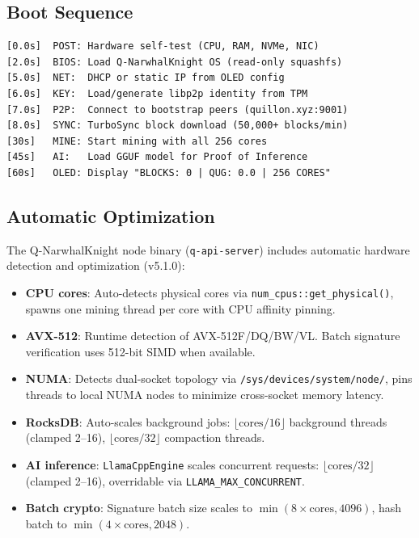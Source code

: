 \documentclass[11pt,a4paper]{article}
\begin{document}
\subsection{Boot Sequence}

\begin{lstlisting}[caption={Forge boot sequence (automated firmware)}]
[0.0s]  POST: Hardware self-test (CPU, RAM, NVMe, NIC)
[2.0s]  BIOS: Load Q-NarwhalKnight OS (read-only squashfs)
[5.0s]  NET:  DHCP or static IP from OLED config
[6.0s]  KEY:  Load/generate libp2p identity from TPM
[7.0s]  P2P:  Connect to bootstrap peers (quillon.xyz:9001)
[8.0s]  SYNC: TurboSync block download (50,000+ blocks/min)
[30s]   MINE: Start mining with all 256 cores
[45s]   AI:   Load GGUF model for Proof of Inference
[60s]   OLED: Display "BLOCKS: 0 | QUG: 0.0 | 256 CORES"
\end{lstlisting}

\subsection{Automatic Optimization}

The Q-NarwhalKnight node binary (\texttt{q-api-server}) includes automatic hardware detection and optimization (v5.1.0):

\begin{itemize}[noitemsep]
    \item \textbf{CPU cores}: Auto-detects physical cores via \texttt{num\_cpus::get\_physical()}, spawns one mining thread per core with CPU affinity pinning.
    \item \textbf{AVX-512}: Runtime detection of AVX-512F/DQ/BW/VL. Batch signature verification uses 512-bit SIMD when available.
    \item \textbf{NUMA}: Detects dual-socket topology via \texttt{/sys/devices/system/node/}, pins threads to local NUMA nodes to minimize cross-socket memory latency.
    \item \textbf{RocksDB}: Auto-scales background jobs: $\lfloor\text{cores}/16\rfloor$ background threads (clamped 2--16), $\lfloor\text{cores}/32\rfloor$ compaction threads.
    \item \textbf{AI inference}: \texttt{LlamaCppEngine} scales concurrent requests: $\lfloor\text{cores}/32\rfloor$ (clamped 2--16), overridable via \texttt{LLAMA\_MAX\_CONCURRENT}.
    \item \textbf{Batch crypto}: Signature batch size scales to $\min(8 \times \text{cores}, 4096)$, hash batch to $\min(4 \times \text{cores}, 2048)$.
\end{itemize}
\end{document}
